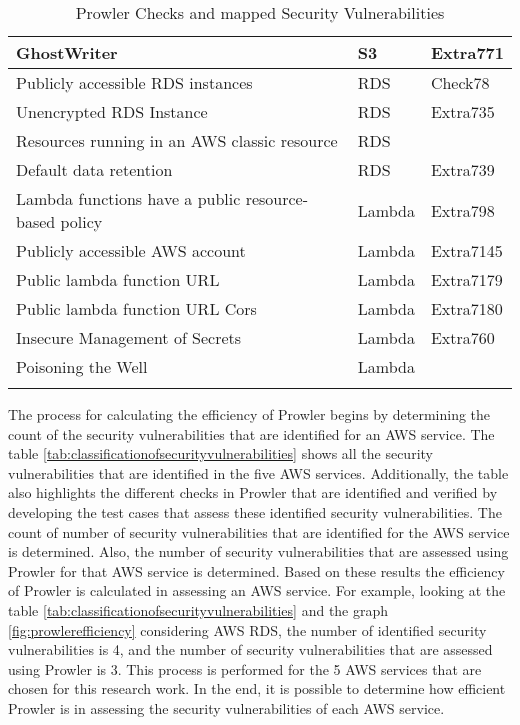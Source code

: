 \begin{longtable}{|p{10cm}|p{2.4cm}|p{2cm}|}
    \hline
    GhostWriter & S3 & Extra771 \\
    \hline
    Publicly accessible RDS instances & RDS & Check78\\
    \hline
    Unencrypted RDS Instance & RDS & Extra735\\
    \hline
    Resources running in an AWS classic resource & RDS & \\
    \hline
    Default data retention & RDS & Extra739\\
    \hline
    Lambda functions have a public resource-based policy & Lambda & Extra798 \\
    \hline
    Publicly accessible AWS account & Lambda & Extra7145 \\
    \hline
    Public lambda function URL & Lambda & Extra7179 \\
    \hline
    Public lambda function URL Cors & Lambda & Extra7180 \\
    \hline
    Insecure Management of Secrets & Lambda & Extra760\\
    \hline
    Poisoning the Well & Lambda & \\
    \hline
    \caption{Prowler Checks and mapped Security Vulnerabilities}
    \label{tab:securityvulnerabilitiescheckin prowler}
\end{longtable}

\par The process for calculating the efficiency of Prowler begins by determining the count of the security vulnerabilities that are identified for an AWS service.
The table \ref{tab:classificationofsecurityvulnerabilities} shows all the security vulnerabilities that are identified in the five AWS services.
Additionally, the table also highlights the different checks in Prowler that are identified and verified by developing the test cases that assess these identified security vulnerabilities.
The count of number of security vulnerabilities that are identified for the AWS service is determined.
Also, the number of security vulnerabilities that are assessed using Prowler for that AWS service is determined.
Based on these results the efficiency of Prowler is calculated in assessing an AWS service.
For example, looking at the table \ref{tab:classificationofsecurityvulnerabilities} and the graph \ref{fig:prowlerefficiency} considering AWS RDS, the number of identified security vulnerabilities is 4, and the number of security vulnerabilities that are assessed using Prowler is 3.
This process is performed for the 5 AWS services that are chosen for this research work.
In the end, it is possible to determine how efficient Prowler is in assessing the security vulnerabilities of each AWS service.


